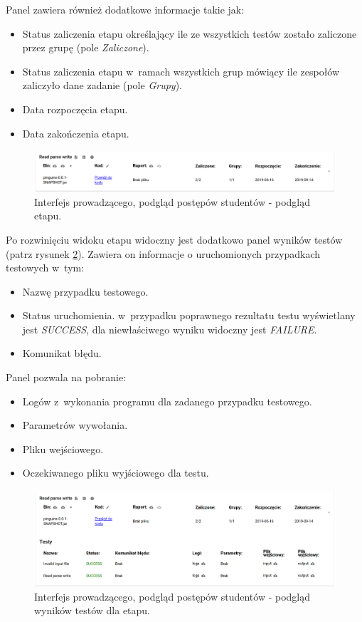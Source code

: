 Panel zawiera również dodatkowe informacje takie jak:
\begin{itemize}
    \item Status zaliczenia etapu określający ile ze wszystkich testów zostało zaliczone przez grupę (pole \textit{Zaliczone}).
    \item Status zaliczenia etapu w~ramach wszystkich grup mówiący ile zespołów zaliczyło dane zadanie (pole \textit{Grupy}).
    \item Data rozpoczęcia etapu.
    \item Data zakończenia etapu.
\end{itemize}

\begin{figure}[h]
    \centering
    \includegraphics[width = 16cm]{chapter04/lecturer_preview_stage.png}
    \caption{Interfejs prowadzącego, podgląd postępów studentów - podgląd etapu.}
    \label{fig:lecturer-preview-stage}
\end{figure}

Po rozwinięciu widoku etapu widoczny jest dodatkowo panel wyników testów (patrz rysunek \ref{fig:lecturer-preview-stage-tests}).
Zawiera on informacje o uruchomionych przypadkach testowych w~tym:
\begin{itemize}
    \item Nazwę przypadku testowego.
    \item Status uruchomienia. w~przypadku poprawnego rezultatu testu wyświetlany jest \textit{SUCCESS}, dla niewłaściwego wyniku widoczny jest \textit{FAILURE}.
    \item Komunikat błędu.
\end{itemize}

Panel pozwala na pobranie:
\begin{itemize}
    \item Logów z~wykonania programu dla zadanego przypadku testowego.
    \item Parametrów wywołania.
    \item Pliku wejściowego.
    \item Oczekiwanego pliku wyjściowego dla testu.
\end{itemize}

\begin{figure}[h]
    \centering
    \includegraphics[width = 16cm]{chapter04/lecturer_preview_stage_tests.png}
    \caption{Interfejs prowadzącego, podgląd postępów studentów - podgląd wyników testów dla etapu.}
    \label{fig:lecturer-preview-stage-tests}
\end{figure}

